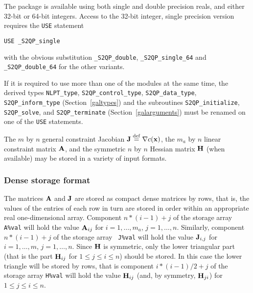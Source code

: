 \documentclass{galahad}
\newcommand{\packagename}{S2QP}
\newcommand{\fullpackagename}{\libraryname\_\packagename}
\newcommand{\Grad}{\nabla}
\begin{document}

\galhowto

The package is available using both single and double precision reals, 
and either 32-bit or 64-bit integers. Access to the 32-bit integer,
single precision version requires the {\tt USE} statement
\medskip

\hspace{8mm} {\tt USE \fullpackagename\_single}

\medskip
\noindent
with the obvious substitution {\tt \fullpackagename\_double},
{\tt \fullpackagename\_single\_64} and 
{\tt \fullpackagename\_double\_64} for the other variants.

\noindent
If it is required to use more than one of the modules at the same time, 
the derived types
{\tt NLPT\_type}, {\tt S2QP\_control\_type}, {\tt S2QP\_data\_type}, 
{\tt S2QP\_inform\_type} (Section~\ref{galtypes})
and the subroutines {\tt S2QP\_initialize}, {\tt S2QP\_solve}, and
{\tt S2QP\_terminate} (Section~\ref{galarguments}) must be renamed on
one of the {\tt USE} statements.


\galmatrix The $m$ by $n$ general constraint Jacobian $\bmJ \eqdef
\Grad c(\bmx)$, the $m_a$ by $n$ linear constraint matrix ${\mathbf{A}}$, and
the symmetric $n$ by $n$ Hessian matrix ${\mathbf{H}}$ (when available) may
be stored in a variety of input formats.

\subsubsection{Dense storage format}\label{dense}
The matrices ${\mathbf{A}}$ and ${\mathbf{J}}$ are stored as compact dense matrices by
rows, that is, the values of the entries of each row in turn are
stored in order within an appropriate real one-dimensional array.
Component $n \ast (i-1) + j$ of the storage array {\tt A\%val} will
hold the value ${\mathbf{A}}_{ij}$ for $i = 1, \ldots , m_a$, $j = 1, \ldots ,
n$.  Similarly, component $n \ast (i-1) + j$ of the storage array {\tt
  J\%val} will hold the value ${\mathbf{J}}_{i,j}$ for $i = 1, \ldots , m$, $j =
1, \ldots , n$.  Since ${\mathbf{H}}$ is symmetric, only the lower triangular
part (that is the part ${\mathbf{H}}_{ij}$ for $1 \leq j \leq i \leq n$)
should be stored. In this case the lower triangle will be stored by rows, that is
component $i \ast (i-1)/2 + j$ of the storage array {\tt H\%val} will
hold the value ${\mathbf{H}}_{ij}$ (and, by symmetry, ${\mathbf{H}}_{ji}$) for $1 \leq j
\leq i \leq n$.
\end{document}
